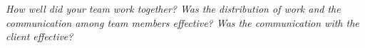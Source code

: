 \emph{How well did your team work together?  Was the distribution of work and the communication among team members effective? Was the communication with the client effective?}